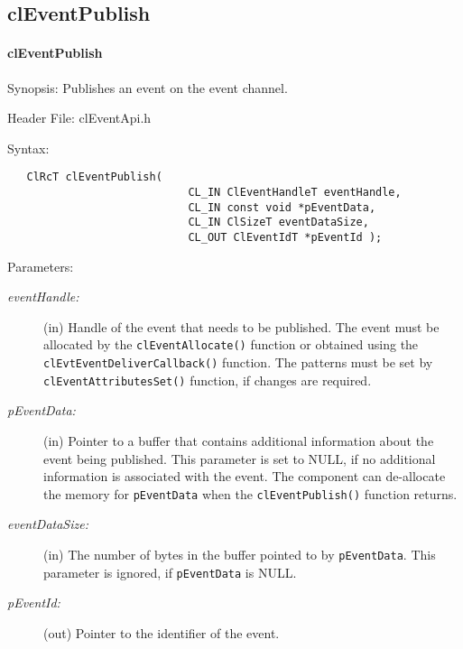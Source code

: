 \begin{flushleft}
\subsection{clEventPublish}
\hypertarget{pageem113}{}\paragraph{cl\-Event\-Publish}\label{pageem113}
\begin{Desc}
\item[Synopsis:]Publishes an event on the event channel.\end{Desc}
\begin{Desc}
\item[Header File:]clEventApi.h\end{Desc}
\begin{Desc}
\item[Syntax:]

\footnotesize\begin{verbatim}   ClRcT clEventPublish(
              				CL_IN ClEventHandleT eventHandle,
              				CL_IN const void *pEventData,
              				CL_IN ClSizeT eventDataSize,
              				CL_OUT ClEventIdT *pEventId );
\end{verbatim}
\normalsize
\end{Desc}
\begin{Desc}
\item[Parameters:]
\begin{description}
\item[{\em event\-Handle:}](in) Handle of the event that needs to be published. The event must be allocated by the {\tt{clEventAllocate()}} function or obtained 
using the {\tt{cl\-Evt\-Event\-Deliver\-Callback()}} function. The patterns must be set by {\tt{clEventAttributesSet()}} function, if changes are 
required.
\item[{\em p\-Event\-Data:}](in) Pointer to a buffer that contains additional information about the event being published. This parameter is set 
to NULL, if no additional information is associated with the event. The component can de-allocate the memory for {\tt{p\-Event\-Data}} when 
the {\tt{clEventPublish()}} function returns.

\item[{\em event\-Data\-Size:}](in) The number of bytes in the buffer pointed to by {\tt{p\-Event\-Data}}. 
This parameter is ignored, if {\tt{p\-Event\-Data}} is NULL.

\item[{\em p\-Event\-Id:}](out) Pointer to the identifier of the event.\end{description}


\end{Desc}
\end{flushleft}
